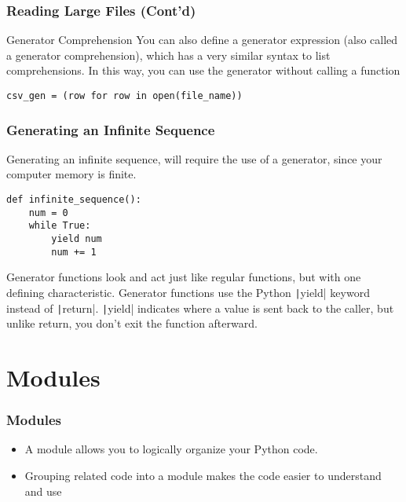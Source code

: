 \documentclass{../py-lecture}
\begin{document}
\begin{frame}[fragile]
  \frametitle{Reading Large Files (Cont'd)}
  \begin{block}{Generator Comprehension}
  You can also define a generator expression (also called a generator comprehension), which has a very similar syntax to list comprehensions. In this way, you can use the generator without calling a function
  \end{block}
  \begin{verbatim}
csv_gen = (row for row in open(file_name))
  \end{verbatim}
\end{frame}

\begin{frame}[fragile]
  \frametitle{Generating an Infinite Sequence}
  \begin{block}{}
    Generating an infinite sequence, will require the use of a generator, since your computer memory is finite.
  \end{block}
  \begin{verbatim}
def infinite_sequence():
    num = 0
    while True:
        yield num
        num += 1
  \end{verbatim}
\end{frame}

\begin{frame}
  \begin{block}{}
    Generator functions look and act just like regular functions, but with one defining characteristic. Generator functions use the Python \texttt|yield| keyword instead of \texttt|return|.
    \texttt|yield| indicates where a value is sent back to the caller, but unlike return, you don’t exit the function afterward.
  \end{block}
\end{frame}

\section{Modules}

\begin{frame}
	\frametitle{Modules}
  \begin{itemize}
    \item A module allows you to logically organize your Python code.
    \item Grouping related code into a module makes the code easier to understand and use
  \end{itemize}
\end{frame}
\end{document}
